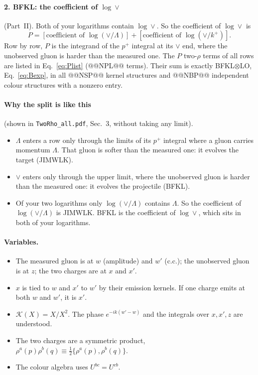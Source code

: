 \documentclass[10pt]{article}
\numberwithin{equation}{section}
\newcommand{\KK}{\mathcal K}
\begin{document}
\paragraph{2. BFKL: the coefficient of $\log\vee$} (Part~II). Both of your logarithms contain $\log\vee$. So the coefficient of $\log\vee$ is
\begin{equation*}
P=[\text{coefficient of }\log(\vee/\Lambda)]+[\text{coefficient of }\log(\vee/k^+)].
\end{equation*}
Row by row, $P$ is the integrand of the $p^+$ integral at its $\vee$ end, where the unobserved gluon is harder than the measured one. The $P$ two-$\rho$ terms of all rows are listed in Eq.~\eqref{eq:Plist} (@@NPL@@ terms). Their sum is exactly BFKL$\otimes$LO, Eq.~\eqref{eq:Bexp}, in all @@NSP@@ kernel structures and @@NBP@@ independent colour structures with a nonzero entry.

\paragraph{Why the split is like this} (shown in \texttt{TwoRho\_all.pdf}, Sec.~3, without taking any limit).
\begin{itemize}
\item $\Lambda$ enters a row only through the limits of its $p^+$ integral where a gluon carries momentum $\Lambda$. That gluon is softer than the measured one: it evolves the target (JIMWLK).
\item $\vee$ enters only through the upper limit, where the unobserved gluon is harder than the measured one: it evolves the projectile (BFKL).
\item Of your two logarithms only $\log(\vee/\Lambda)$ contains $\Lambda$. So the coefficient of $\log(\vee/\Lambda)$ is JIMWLK. BFKL is the coefficient of $\log\vee$, which sits in both of your logarithms.
\end{itemize}

\paragraph{Variables.}
\begin{itemize}
\item The measured gluon is at $w$ (amplitude) and $w'$ (c.c.); the unobserved gluon is at $z$; the two charges are at $x$ and $x'$.
\item $x$ is tied to $w$ and $x'$ to $w'$ by their emission kernels. If one charge emits at both $w$ and $w'$, it is $x'$.
\item $\KK(X)=X/X^2$. The phase $e^{-ik(w'-w)}$ and the integrals over $x,x',z$ are understood.
\item The two charges are a symmetric product, $\rho^a(p)\rho^b(q)\equiv\frac12\{\rho^a(p),\rho^b(q)\}$.
\item The colour algebra uses $U^{bc}=U^{cb}$.
\end{itemize}
\end{document}
